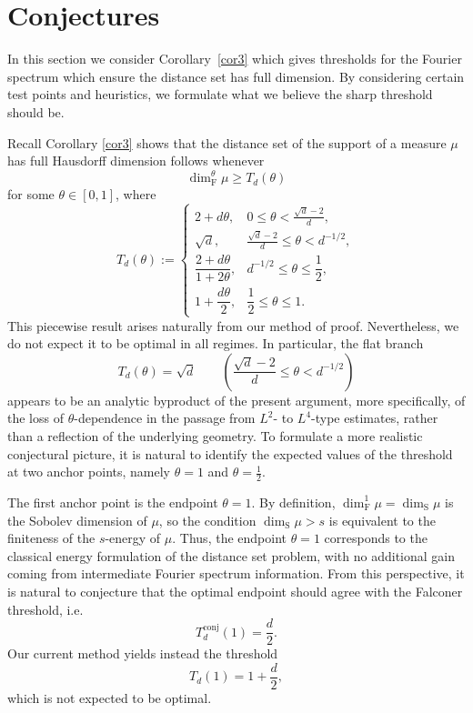 \documentclass[11pt]{amsart}
\numberwithin{equation}{section}
\renewcommand{\ge}{\geqslant}
\renewcommand{\le}{\leqslant}
\newcommand{\fs}{\dim^\theta_{\mathrm{F}}}
\newcommand{\sd}{\dim_{\mathrm{S}}}
\theoremstyle{plain}
\theoremstyle{remark}
\begin{document}
\section{Conjectures}
In this section we consider  Corollary~\ref{cor3} which gives thresholds for the Fourier spectrum which ensure the distance set has full dimension.  By considering certain test points and heuristics, we formulate what we believe the sharp threshold should be.

Recall Corollary \ref{cor3} shows that the  distance set of the support of a measure $\mu$ has full Hausdorff dimension follows whenever 
\[
\fs \mu \ge T_d(\theta)
\]
for some \(\theta\in[0,1]\), where
\[
T_d(\theta):=
\begin{cases}
2+d\theta, & 0 \le \theta < \frac{\sqrt d - 2}{d},\\[1ex]
\sqrt d, & \frac{\sqrt d - 2}{d} \le \theta < d^{-1/2},\\[1ex]
\dfrac{2+d\theta}{1+2\theta}, & d^{-1/2}\le \theta\le \dfrac12,\\[2ex]
1+\dfrac{d\theta}{2}, & \dfrac12\le \theta\le 1.
\end{cases}
\]
This piecewise result arises naturally from our  method of proof. Nevertheless, we do not expect it to be optimal in all regimes. In particular, the flat branch
\[
T_d(\theta)=\sqrt d
\qquad
\left(\frac{\sqrt d - 2}{d} \le \theta < d^{-1/2}\right)
\]
appears to be an analytic byproduct of the present argument, more specifically, of the loss of \(\theta\)-dependence in the passage from \(L^2\)- to \(L^4\)-type estimates, rather than a reflection of the underlying geometry. To formulate a more realistic conjectural picture, it is natural to identify the expected values of the threshold at two anchor points, namely \(\theta=1\) and \(\theta=\frac12\). 

The first anchor point is the endpoint \(\theta=1\). By definition, $\dim_\mathrm{F}^1 \mu = \sd \mu$ is the Sobolev dimension of \(\mu\), so the condition \(\sd \mu >s\) is equivalent to the finiteness of the \(s\)-energy of \(\mu\). Thus, the endpoint \(\theta=1\) corresponds to the classical energy formulation of the distance set problem, with no additional gain coming from intermediate Fourier spectrum information. From this perspective, it is natural to conjecture that the optimal endpoint should agree with the Falconer threshold, i.e.
\[
T_d^{\mathrm{conj}}(1)=\frac d2.
\]
Our current method yields instead the threshold 
\[
T_d(1)=1+\frac d2,
\]
which is not expected to be optimal.
\end{document}
